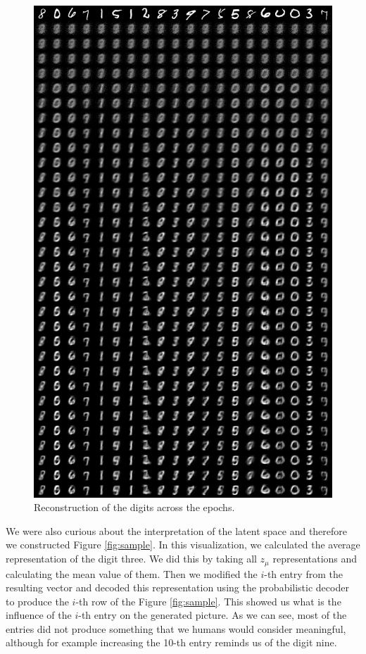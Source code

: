 \begin{figure}
    \centering
    \includegraphics[width=\linewidth]{images/reconstruction_15.png}
    \caption{Reconstruction of the digits across the epochs.}
    \label{fig:reconstruction}
\end{figure}

\newpage
We were also curious about the interpretation of the latent space and therefore we constructed Figure \ref{fig:sample}.
In this visualization, we calculated the average representation of the digit three.
We did this by taking all $z_{\mu}$ representations and calculating the mean value of them.
Then we modified the $i$-th entry from the resulting vector and decoded this representation using the probabilistic decoder to produce the $i$-th row of the Figure \ref{fig:sample}.
This showed us what is the influence of the $i$-th entry on the generated picture.
As we can see, most of the entries did not produce something that we humans would consider meaningful, although for example increasing the 10-th entry reminds us of the digit nine.

